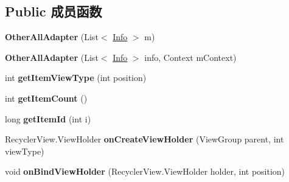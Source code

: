 \subsection*{Public 成员函数}
\begin{DoxyCompactItemize}
\item 
\mbox{\label{classcom_1_1example_1_1twitter_1_1_other_all_adapter_a57cae2454715ae0288168c4fd7ad9828}} 
{\bfseries Other\+All\+Adapter} (List$<$ \mbox{\hyperlink{classcom_1_1example_1_1twitter_1_1_info}{Info}} $>$ m)
\item 
\mbox{\label{classcom_1_1example_1_1twitter_1_1_other_all_adapter_abdf43d9e08776176e96d706b1d3e5f4c}} 
{\bfseries Other\+All\+Adapter} (List$<$ \mbox{\hyperlink{classcom_1_1example_1_1twitter_1_1_info}{Info}} $>$ info, Context m\+Context)
\item 
\mbox{\label{classcom_1_1example_1_1twitter_1_1_other_all_adapter_a4c98160d19c39120f64792bf9a664f77}} 
int {\bfseries get\+Item\+View\+Type} (int position)
\item 
\mbox{\label{classcom_1_1example_1_1twitter_1_1_other_all_adapter_ab8e3f95fd0dae545dc27a303bf10a394}} 
int {\bfseries get\+Item\+Count} ()
\item 
\mbox{\label{classcom_1_1example_1_1twitter_1_1_other_all_adapter_ad47d13c349ace6c152e7fd55cb66a4c7}} 
long {\bfseries get\+Item\+Id} (int i)
\item 
\mbox{\label{classcom_1_1example_1_1twitter_1_1_other_all_adapter_a5826521bb7d908a8893bbb372b884281}} 
Recycler\+View.\+View\+Holder {\bfseries on\+Create\+View\+Holder} (View\+Group parent, int view\+Type)
\item 
\mbox{\label{classcom_1_1example_1_1twitter_1_1_other_all_adapter_ac4c7488050b7410fb6917fc3ec88e0c0}} 
void {\bfseries on\+Bind\+View\+Holder} (Recycler\+View.\+View\+Holder holder, int position)
\end{DoxyCompactItemize}
